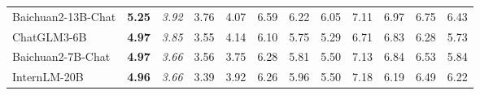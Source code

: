 \begin{table}[t]
{\begin{tabular}{@{}l|c|ccc|ccccccc@{}}
Baichuan2-13B-Chat              & \textbf{5.25}                     & \multicolumn{1}{c|}{\textit{3.92}}                                   & 3.76                                            & 4.07                                            & \multicolumn{1}{c|}{6.59}                                            & 6.22                                            & 6.05                                            & 7.11                                            & 6.97                                            & 6.75                                            & 6.43                                            \\
ChatGLM3-6B                     & \textbf{4.97}                     & \multicolumn{1}{c|}{\textit{3.85}}                                   & 3.55                                            & 4.14                                            & \multicolumn{1}{c|}{6.10}                                            & 5.75                                            & 5.29                                            & 6.71                                            & 6.83                                            & 6.28                                            & 5.73                                            \\
Baichuan2-7B-Chat               & \textbf{4.97}                     & \multicolumn{1}{c|}{\textit{3.66}}                                   & 3.56                                            & 3.75                                            & \multicolumn{1}{c|}{6.28}                                            & 5.81                                            & 5.50                                            & 7.13                                            & 6.84                                            & 6.53                                            & 5.84                                            \\
InternLM-20B                    & \textbf{4.96}                     & \multicolumn{1}{c|}{\textit{3.66}}                                   & 3.39                                            & 3.92                                            & \multicolumn{1}{c|}{6.26}                                            & 5.96                                            & 5.50                                            & 7.18                                            & 6.19                                            & 6.49                                            & 6.22                                            \\

\end{tabular}}
\end{table}
